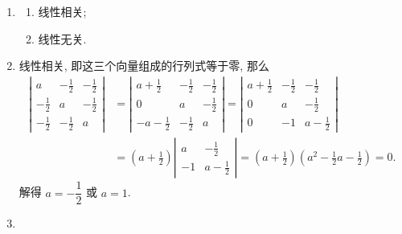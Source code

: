 \documentclass[a4paper, 11pt]{ctexart}
\begin{document}
\begin{enumerate}
    \item %
        \begin{multicols}{2}
            \begin{enumerate}[(1)]
                \item %
                    线性相关;
                \item %
                    线性无关.
            \end{enumerate}
        \end{multicols}
    \item %
        线性相关, 即这三个向量组成的行列式等于零, 那么
        \begin{align*}
            \left|
                \begin{array}{ccc}
                    a & -\frac12 & -\frac12 \\
                    -\frac12 & a & -\frac12 \\
                    -\frac12 & -\frac12 & a
                \end{array}
            \right|
            &=
            \left|
                \begin{array}{ccc}
                    a+\frac12 & -\frac12 & -\frac12 \\
                    0 & a & -\frac12 \\
                    -a-\frac12 & -\frac12 & a
                \end{array}
            \right|
            =
            \left|
                \begin{array}{ccc}
                    a+\frac12 & -\frac12 & -\frac12 \\
                    0 & a & -\frac12 \\
                    0 & -1 & a-\frac12
                \end{array}
            \right| \\
            &=
            \left(a+\frac12\right)
            \left|
                \begin{array}{cc}
                    a & -\frac12 \\
                    -1 & a-\frac12
                \end{array}
            \right|
            =
            \left(a+\frac12\right)\left(a^2-\frac12a-\frac12\right)
            = 0.
        \end{align*}
        解得 $a = -\dfrac12$ 或 $a = 1$.
    \item %

\end{enumerate}
\end{document}
